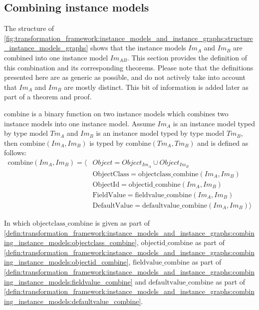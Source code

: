 \subsection{Combining instance models}
\label{subsec:transformation_framework:instance_models_and_instance_graphs:combining_instance_models}

The structure of \cref{fig:transformation_framework:instance_models_and_instance_graphs:structure_instance_models_graphs} shows that the instance models $Im_A$ and $Im_B$ are combined into one instance model $Im_{AB}$. This section provides the definition of this combination and its corresponding theorems. Please note that the definitions presented here are as generic as possible, and do not actively take into account that $Im_{A}$ and $Im_{B}$ are mostly distinct. This bit of information is added later as part of a theorem and proof.

\begin{defin}
\label{defin:transformation_framework:instance_models_and_instance_graphs:combining_instance_models:combine}
$\mathrm{combine}$ is a binary function on two instance models which combines two instance models into one instance model. Assume $Im_A$ is an instance model typed by type model $Tm_A$ and $Im_B$ is an instance model typed by type model $Tm_B$, then $\mathrm{combine}(Im_A, Im_B)$ is typed by $\mathrm{combine}(Tm_A, Tm_B)$ and is defined as follows:
\begin{align*}
\mathrm{combine}(Im_A, Im_B) = \langle&
Object = Object_{Im_A} \cup Object_{Im_B} \\&
\mathrm{ObjectClass} = \mathrm{objectclass\_\!combine}(Im_A, Im_B) \\&
\mathrm{ObjectId} = \mathrm{objectid\_\!combine}(Im_A, Im_B) \\&
\mathrm{FieldValue} = \mathrm{fieldvalue\_\!combine}(Im_A, Im_B) \\&
\mathrm{DefaultValue} = \mathrm{defaultvalue\_\!combine}(Im_A, Im_B)\rangle
\end{align*}

In which $\mathrm{objectclass\_\!combine}$ is given as part of \cref{defin:transformation_framework:instance_models_and_instance_graphs:combining_instance_models:objectclass_combine}, $\mathrm{objectid\_\!combine}$ as part of \cref{defin:transformation_framework:instance_models_and_instance_graphs:combining_instance_models:objectid_combine}, $\mathrm{fieldvalue\_\!combine}$ as part of \cref{defin:transformation_framework:instance_models_and_instance_graphs:combining_instance_models:fieldvalue_combine} and $\mathrm{defaultvalue\_\!combine}$ as part of \cref{defin:transformation_framework:instance_models_and_instance_graphs:combining_instance_models:defaultvalue_combine}.
\end{defin}

